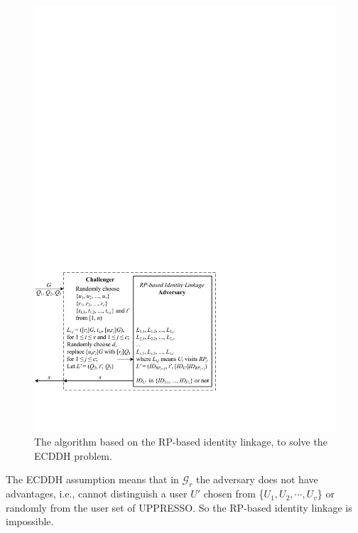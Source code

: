\begin{figure}[tb]
  \centering
  \includegraphics[width=0.96\linewidth]{fig/dalgorithm.pdf}
  \caption{The algorithm based on the RP-based identity linkage, to solve the ECDDH problem.}
  \label{fig:dalgorithm}
\end{figure}

The ECDDH assumption means that in $\mathcal{G}_r$ the adversary does not have advantages,
    i.e., cannot distinguish a user $U'$ chosen from \{${U_1}, {U_2}, \cdots, {U_v}$\}
        or randomly from the user set of UPPRESSO.
So the RP-based identity linkage is impossible.



